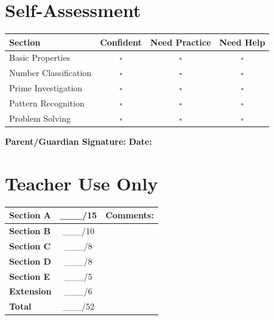 \documentclass{article}
\begin{document}
\section*{Self-Assessment}
\begin{tabular}{|l|c|c|c|}
\hline
\textbf{Section} & \textbf{Confident} & \textbf{Need Practice} & \textbf{Need Help} \\
\hline
Basic Properties & $\square$ & $\square$ & $\square$ \\
\hline
Number Classification & $\square$ & $\square$ & $\square$ \\
\hline
Prime Investigation & $\square$ & $\square$ & $\square$ \\
\hline
Pattern Recognition & $\square$ & $\square$ & $\square$ \\
\hline
Problem Solving & $\square$ & $\square$ & $\square$ \\
\hline
\end{tabular}

\vspace{0.5cm}

\textbf{Parent/Guardian Signature:} \underline{\hspace{5cm}} \textbf{Date:} \underline{\hspace{3cm}}

\section*{Teacher Use Only}
\begin{tabular}{|l|c|l|}
\hline
\textbf{Section A} & \_\_\_/15 & Comments: \\
\hline
\textbf{Section B} & \_\_\_/10 & \\
\hline
\textbf{Section C} & \_\_\_/8 & \\
\hline
\textbf{Section D} & \_\_\_/8 & \\
\hline
\textbf{Section E} & \_\_\_/5 & \\
\hline
\textbf{Extension} & \_\_\_/6 & \\
\hline
\textbf{Total} & \_\_\_/52 & \\
\hline
\end{tabular}
\end{document}
